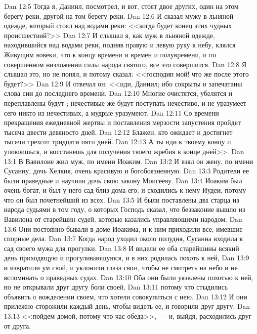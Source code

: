 \vs Dan 12:5 Тогда я, Даниил, посмотрел, и вот, стоят двое других, один на этом берегу реки, другой на том берегу реки.
\vs Dan 12:6 И  сказал мужу в льняной одежде, который стоял над водами реки: <<когда будет конец этих чудных происшествий?>>
\vs Dan 12:7 И слышал я, как муж в льняной одежде, находившийся над водами реки, подняв правую и левую руку к небу, клялся Живущим вовеки, что к концу времени и времен и полувремени, и по совершенном низложении силы народа святого, все это совершится.
\vs Dan 12:8 Я слышал это, но не понял, и потому сказал: <<господин мой! что же после этого будет?>>
\vs Dan 12:9 И отвечал он: <<иди, Даниил; ибо сокрыты и запечатаны слова сии до последнего времени.
\vs Dan 12:10 Многие очистятся, убелятся и переплавлены будут ; нечестивые же будут поступать нечестиво, и не уразумеет сего никто из нечестивых, а мудрые уразумеют.
\vs Dan 12:11 Со времени прекращения ежедневной жертвы и поставления мерзости запустения пройдет тысяча двести девяносто дней.
\vs Dan 12:12 Блажен, кто ожидает и достигнет тысячи трехсот тридцати пяти дней.
\vs Dan 12:13 А ты иди к твоему концу и упокоишься, и восстанешь для получения твоего жребия в конце дней>>.
\vs Dan 13:1 В Вавилоне жил муж, по имени Иоаким.
\vs Dan 13:2 И взял он жену, по имени Сусанну, дочь Хелкия, очень красивую и богобоязненную.
\vs Dan 13:3 Родители ее были праведные и научили дочь свою закону Моисееву.
\vs Dan 13:4 Иоаким был очень богат, и был у него сад близ дома его; и сходились к нему Иудеи, потому что он был почетнейший из всех.
\vs Dan 13:5 И были поставлены два старца из народа судьями в том году, о которых Господь сказал, что беззаконие вышло из Вавилона от старейшин-судей, которые казались управляющими народом.
\vs Dan 13:6 Они постоянно бывали в доме Иоакима, и к ним приходили все, имевшие спорные дела.
\vs Dan 13:7 Когда народ уходил около полудня, Сусанна входила в сад своего мужа для прогулки.
\vs Dan 13:8 И видели ее оба старейшины всякий день приходящую и прогуливающуюся, и в них родилась похоть к ней,
\vs Dan 13:9 и извратили ум свой, и уклонили глаза свои, чтобы не смотреть на небо и не вспоминать о праведных судах.
\vs Dan 13:10 Оба они были уязвлены похотью к ней, но не открывали друг другу боли своей,
\vs Dan 13:11 потому что стыдились объявить о вожделении своем, что хотели совокупиться с нею.
\vs Dan 13:12 И они прилежно сторожили каждый день, чтобы видеть ее, и говорили друг другу:
\vs Dan 13:13 <<пойдем домой, потому что час обеда>>,~--- и, выйдя, расходились друг от друга,
